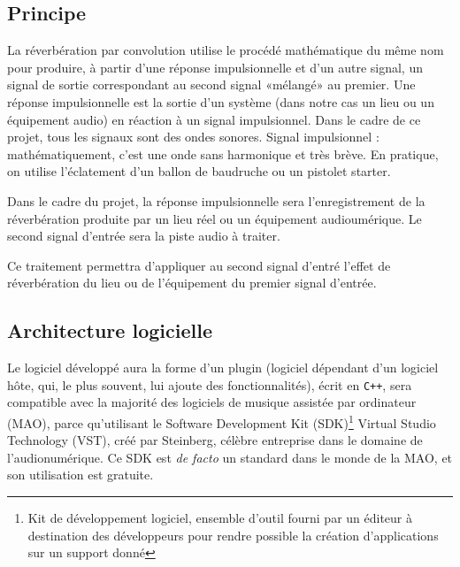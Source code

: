 %
\subsection{Principe}
La réverbération par convolution utilise le procédé mathématique du même nom pour produire, à partir d'une réponse impulsionnelle et d'un autre signal, un signal de sortie correspondant au second signal «mélangé» au premier.
Une réponse impulsionnelle est la sortie d'un système (dans notre cas un lieu ou un équipement audio) en réaction à un signal impulsionnel. Dans le cadre de ce projet, tous les signaux sont des ondes sonores.
Signal impulsionnel : mathématiquement, c'est une onde sans harmonique et très brève. En pratique, on utilise l'éclatement d'un ballon de baudruche ou un pistolet starter.

Dans le cadre du projet, la réponse impulsionnelle sera l'enregistrement de la réverbération produite par un lieu réel ou un équipement audioumérique.
Le second signal d'entrée sera la piste audio à traiter.

Ce traitement permettra d'appliquer au second signal d'entré l'effet de réverbération du lieu ou de l'équipement du premier signal d'entrée.



\subsection{Architecture logicielle}
Le logiciel développé aura la forme d'un plugin (logiciel dépendant d'un logiciel hôte, qui, le plus souvent, lui ajoute des fonctionnalités), écrit en {\tt C++}, sera compatible avec la majorité des logiciels de musique assistée par ordinateur (MAO), parce qu'utilisant le Software Development Kit (SDK)\footnote{Kit de développement logiciel, ensemble d'outil fourni par un éditeur à destination des développeurs pour rendre possible la création d'applications sur un support donné}  Virtual Studio Technology (VST), créé par Steinberg, célèbre entreprise dans le domaine de l'audionumérique. Ce SDK est \emph{de facto} un standard dans le monde de la MAO, et son utilisation est gratuite.

